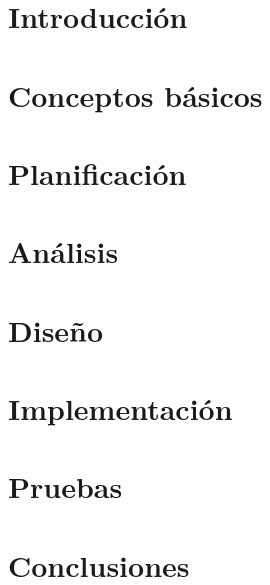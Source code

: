 \documentclass[a4paper,11pt]{book}
\begin{document}
\renewcommand{\figurename}{Figura}
\renewcommand{\listfigurename}{Indice de figuras}
\renewcommand{\tablename}{Tabla}
\renewcommand{\listtablename}{Indice de tablas}

\pagestyle{empty}

\cleardoublepage


\cleardoublepage
\pagestyle{plain}

\frontmatter %


\cleardoublepage

\tableofcontents
\listoffigures
\listoftables

\mainmatter %

\chapter{Introducción}


\chapter{Conceptos básicos}


\chapter{Planificación}


\chapter{Análisis}


\chapter{Diseño}


\chapter{Implementación}


\chapter{Pruebas}


\chapter{Conclusiones}

\end{document}
